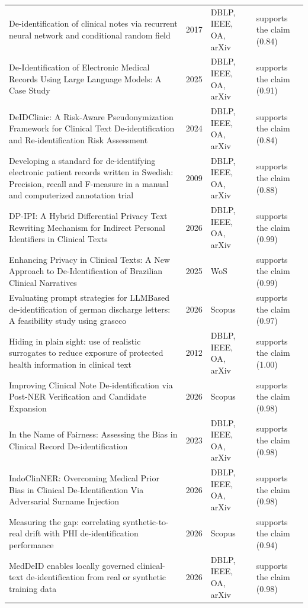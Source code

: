 \begin{longtable}{@{}%
  >{\raggedright\arraybackslash}p{}c%
  >{\raggedright\arraybackslash}p{}%
  >{\raggedright\arraybackslash}p{}@{}}
De-identification of clinical notes via recurrent neural network and conditional random field & 2017 & DBLP, IEEE, OA, arXiv & supports the claim (0.84) \\
De-Identification of Electronic Medical Records Using Large Language Models: A Case Study & 2025 & DBLP, IEEE, OA, arXiv & supports the claim (0.91) \\
DeIDClinic: A Risk-Aware Pseudonymization Framework for Clinical Text De-identification and Re-identification Risk Assessment & 2024 & DBLP, IEEE, OA, arXiv & supports the claim (0.84) \\
Developing a standard for de-identifying electronic patient records written in Swedish: Precision, recall and F-measure in a manual and computerized annotation trial & 2009 & DBLP, IEEE, OA, arXiv & supports the claim (0.88) \\
DP-IPI: A Hybrid Differential Privacy Text Rewriting Mechanism for Indirect Personal Identifiers in Clinical Texts & 2026 & DBLP, IEEE, OA, arXiv & supports the claim (0.99) \\
Enhancing Privacy in Clinical Texts: A New Approach to De-Identification of Brazilian Clinical Narratives & 2025 & WoS & supports the claim (0.99) \\
Evaluating prompt strategies for LLMBased de-identification of german discharge letters: A feasibility study using grascco & 2026 & Scopus & supports the claim (0.97) \\
Hiding in plain sight: use of realistic surrogates to reduce exposure of protected health information in clinical text & 2012 & DBLP, IEEE, OA, arXiv & supports the claim (1.00) \\
Improving Clinical Note De-identification via Post-NER Verification and Candidate Expansion & 2026 & Scopus & supports the claim (0.98) \\
In the Name of Fairness: Assessing the Bias in Clinical Record De-identification & 2023 & DBLP, IEEE, OA, arXiv & supports the claim (0.98) \\
IndoClinNER: Overcoming Medical Prior Bias in Clinical De-Identification Via Adversarial Surname Injection & 2026 & DBLP, IEEE, OA, arXiv & supports the claim (0.98) \\
Measuring the gap: correlating synthetic-to-real drift with PHI de-identification performance & 2026 & Scopus & supports the claim (0.94) \\
MedDeID enables locally governed clinical-text de-identification from real or synthetic training data & 2026 & DBLP, IEEE, OA, arXiv & supports the claim (0.98) \\

\end{longtable}
